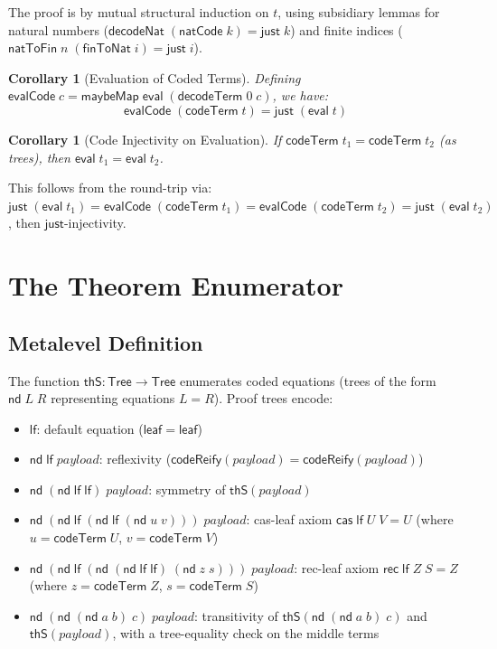 \documentclass[11pt]{article}
\newtheorem{corollary}[theorem]{Corollary}
\newcommand{\lf}{\mathsf{lf}}
\newcommand{\nd}{\mathsf{nd}}
\newcommand{\cas}{\mathsf{cas}}
\newcommand{\rec}{\mathsf{rec}}
\newcommand{\eval}{\mathsf{eval}}
\newcommand{\codeTerm}{\mathsf{codeTerm}}
\newcommand{\decodeTerm}{\mathsf{decodeTerm}}
\newcommand{\codeReify}{\mathsf{codeReify}}
\newcommand{\thS}{\mathsf{thS}}
\newcommand{\Tree}{\mathsf{Tree}}
\newcommand{\evalCode}{\mathsf{evalCode}}
\begin{document}
\noindent The proof is by mutual structural induction on $t$,
using subsidiary lemmas for natural numbers
($\mathsf{decodeNat}\;(\mathsf{natCode}\;k) = \mathsf{just}\;k$) and
finite indices
($\mathsf{natToFin}\;n\;(\mathsf{finToNat}\;i) = \mathsf{just}\;i$).

\begin{corollary}[Evaluation of Coded Terms]\label{cor:evalCode}
Defining $\evalCode\;c = \mathsf{maybeMap}\;\eval\;(\decodeTerm\;0\;c)$, we have:
\[
  \evalCode\;(\codeTerm\;t) = \mathsf{just}\;(\eval\;t)
\]
\end{corollary}

\begin{corollary}[Code Injectivity on Evaluation]\label{cor:codeEvalEq}
If $\codeTerm\;t_1 = \codeTerm\;t_2$ (as trees), then $\eval\;t_1 = \eval\;t_2$.
\end{corollary}

\noindent This follows from the round-trip via:
$\mathsf{just}\;(\eval\;t_1) = \evalCode\;(\codeTerm\;t_1)
= \evalCode\;(\codeTerm\;t_2) = \mathsf{just}\;(\eval\;t_2)$,
then $\mathsf{just}$-injectivity.

\section{The Theorem Enumerator}

\subsection{Metalevel Definition}

The function $\thS : \Tree \to \Tree$ enumerates coded equations (trees of
the form $\nd\;L\;R$ representing equations $L = R$). Proof trees encode:

\begin{itemize}
  \item $\lf$: default equation ($\mathsf{leaf} = \mathsf{leaf}$)
  \item $\nd\;\lf\;\mathit{payload}$: reflexivity ($\codeReify(\mathit{payload}) = \codeReify(\mathit{payload})$)
  \item $\nd\;(\nd\;\lf\;\lf)\;\mathit{payload}$: symmetry of $\thS(\mathit{payload})$
  \item $\nd\;(\nd\;\lf\;(\nd\;\lf\;(\nd\;u\;v)))\;\mathit{payload}$:
    cas-leaf axiom $\cas\;\lf\;U\;V = U$ (where $u = \codeTerm\;U$, $v = \codeTerm\;V$)
  \item $\nd\;(\nd\;\lf\;(\nd\;(\nd\;\lf\;\lf)\;(\nd\;z\;s)))\;\mathit{payload}$:
    rec-leaf axiom $\rec\;\lf\;Z\;S = Z$ (where $z = \codeTerm\;Z$, $s = \codeTerm\;S$)
  \item $\nd\;(\nd\;(\nd\;a\;b)\;c)\;\mathit{payload}$: transitivity of
    $\thS(\nd\;(\nd\;a\;b)\;c)$ and $\thS(\mathit{payload})$,
    with a tree-equality check on the middle terms
\end{itemize}
\end{document}
